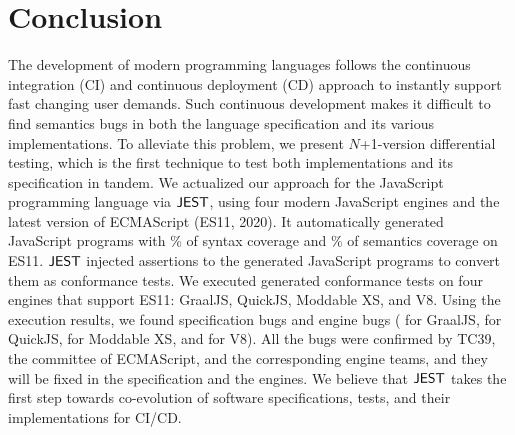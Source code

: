 \section{Conclusion}\label{sec:conclude}
The development of modern programming languages follows the continuous integration (CI) and
continuous deployment (CD) approach to instantly support fast changing user demands.
Such continuous development makes it difficult to find semantics bugs
in both the language specification and its various implementations.
To alleviate this problem, we present $N$+1-version differential testing,
which is the first technique to test both implementations and its specification in tandem.
We actualized our approach for the JavaScript programming language via $\tool$,
using four modern JavaScript engines and the latest version of ECMAScript (ES11, 2020).
It automatically generated  JavaScript programs with \% of syntax
coverage and \% of semantics coverage on ES11.  $\tool$ injected assertions
to the generated JavaScript programs to convert them as conformance tests.
We executed generated conformance tests on four engines that support ES11:
GraalJS, QuickJS, Moddable XS, and V8.  Using the execution results,
we found  specification bugs and  engine bugs ( for GraalJS,
 for QuickJS,  for Moddable XS, and  for V8).
All the bugs were confirmed by TC39, the committee of ECMAScript, and
the corresponding engine teams, and they will be fixed in the specification and the engines.
We believe that $\tool$ takes the first step towards co-evolution of
software specifications, tests, and their implementations for CI/CD.
